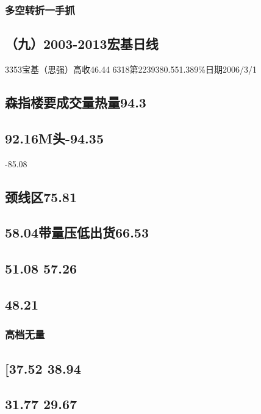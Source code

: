 \documentclass{article}
\begin{document}
\subsubsection{多空转折一手抓}

\subsection{（九）2003-2013宏基日线}

3353宝基（思强）高收46.44 6318第2239380.551.389\%日期2006/3/1

\subsection{森指楼要成交量热量94.3}

\subsection{92.16M头-94.35}

-85.08

\subsection{颈线区75.81}

\subsection{58.04带量压低出货66.53}

\subsection{51.08 57.26}

\subsection{48.21}

\subsubsection{高档无量}

\subsection{[37.52 38.94}

\subsection{31.77 29.67}
\end{document}
